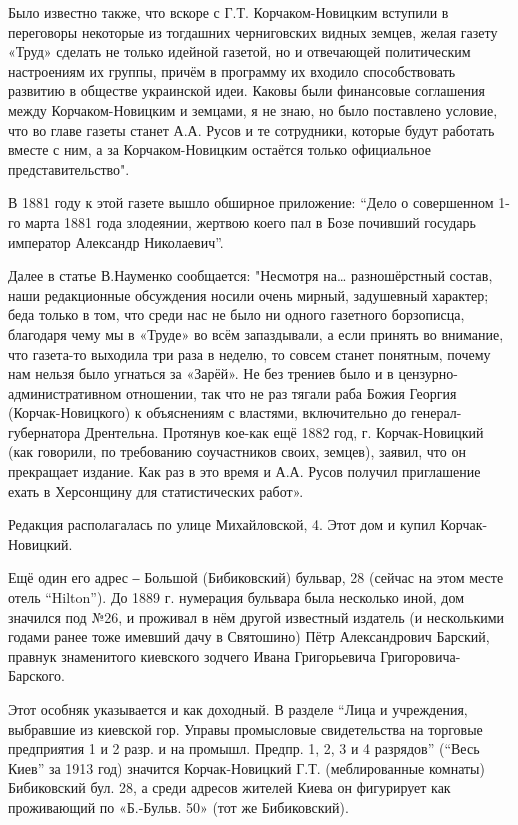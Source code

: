 Было известно также, что вскоре с Г.Т. Корчаком-Новицким вступили в переговоры
некоторые из тогдашних черниговских видных земцев, желая газету «Труд» сделать
не только идейной газетой, но и отвечающей политическим настроениям их группы,
причём в программу их входило способствовать развитию в обществе украинской
идеи. Каковы были финансовые соглашения между Корчаком-Новицким и земцами, я не
знаю, но было поставлено условие, что во главе газеты станет А.А. Русов и те
сотрудники, которые будут работать вместе с ним, а за Корчаком-Новицким
остаётся только официальное представительство". 

В 1881 году к этой газете вышло обширное приложение: \enquote{Дело о совершенном 1-го
марта 1881 года злодеянии, жертвою коего пал в Бозе почивший государь
император Александр Николаевич}.

Далее в статье В.Науменко сообщается: "Несмотря на… разношёрстный состав, наши
редакционные обсуждения носили очень мирный, задушевный характер; беда только в
том, что среди нас не было ни одного газетного борзописца, благодаря чему мы в
«Труде» во всём запаздывали, а если принять во внимание, что газета-то выходила
три раза в неделю, то совсем станет понятным, почему нам нельзя было угнаться
за «Зарёй». Не без трениев было и в цензурно-административном отношении, так
что не раз тягали раба Божия Георгия (Корчак-Новицкого) к объяснениям с
властями, включительно до генерал-губернатора Дрентельна. Протянув кое-как ещё
1882 год, г. Корчак-Новицкий (как говорили, по требованию соучастников своих,
земцев), заявил, что он прекращает издание. Как раз в это время и А.А. Русов
получил приглашение ехать в Херсонщину для статистических работ».

Редакция располагалась по улице Михайловской, 4. Этот дом и купил
Корчак-Новицкий. 

Ещё один его адрес ‒ Большой (Бибиковский) бульвар, 28 (сейчас на этом месте
отель \enquote{Hilton}). До 1889 г. нумерация бульвара была несколько иной, дом
значился под №26, и проживал в нём другой известный издатель (и несколькими
годами ранее тоже имевший дачу в Святошино) Пётр Александрович Барский, правнук
знаменитого киевского зодчего Ивана Григорьевича Григоровича-Барского.

Этот особняк указывается и как доходный. В разделе \enquote{Лица и учреждения,
выбравшие из киевской гор. Управы промысловые свидетельства на торговые
предприятия 1 и 2 разр. и на промышл. Предпр. 1, 2, 3 и 4 разрядов} (\enquote{Весь
Киев} за 1913 год) значится Корчак-Новицкий Г.Т. (меблированные комнаты)
Бибиковский бул. 28, а среди адресов жителей Киева он фигурирует как
проживающий по «Б.-Бульв. 50» (тот же Бибиковский). 

